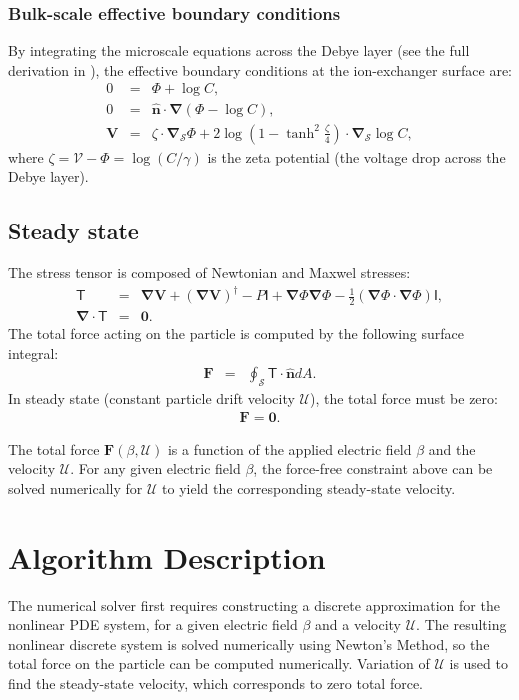 \documentclass[final]{elsarticle}
\newcommand{\pars}[1]{\left(#1\right)}
\newcommand\bnabla{\boldsymbol{\nabla}}
\newcommand\bV{\boldsymbol{V}}
\newcommand\bF{\boldsymbol{F}}
\newcommand\bnhat{\hat{\boldsymbol{n}}}
\newcommand\bzero{\boldsymbol{0}}
\newcommand\cU{\mathscr{U}}
\newcommand\cV{\mathscr{V}}
\newcommand\tI{\mathsf{I}}
\newcommand\tT{\mathsf{T}}
\begin{document}
\subsubsection{Bulk-scale effective boundary conditions}
By integrating the microscale equations across the Debye layer
(see the full derivation in \cite{yariv2010asymptotic}), 
the effective boundary conditions at the ion-exchanger surface are:
\begin{eqnarray*}
0 &=& \varPhi + \log C, \\
0 &=& \bnhat \cdot \bnabla \pars{\varPhi - \log C}, \\
\bV &=& 
\zeta \cdot \bnabla_\mathcal{S} \varPhi 
+ 2\log\pars{1-\tanh^2\frac{\zeta}{4}} \cdot \bnabla_\mathcal{S} \log C,
\end{eqnarray*}
where $\zeta = \cV - \varPhi = \log (C / \gamma)$ 
is the zeta potential (the voltage drop across the Debye layer).

\subsection{Steady state}
The stress tensor is composed of Newtonian and Maxwel stresses:
\begin{eqnarray*}
\tT &=& \bnabla \bV + (\bnabla \bV)^\dagger - P \tI
+ \bnabla \varPhi \bnabla \varPhi - \frac{1}{2} (\bnabla \varPhi \cdot \bnabla \varPhi) \tI, \\
\bnabla \cdot \tT &=& \bzero.
\end{eqnarray*}
The total force acting on the particle is computed by the following surface integral:
\begin{eqnarray*}
\bF &=& \oint_\mathcal{S} \tT \cdot \bnhat dA.
\end{eqnarray*}
In steady state (constant particle drift velocity $\cU$), 
the total force must be zero: 
\begin{eqnarray*}
\bF = \bzero.
\end{eqnarray*}

The total force $\bF(\beta, \cU)$ is a function of the applied electric field $\beta$ and
the velocity $\cU$.
For any given electric field $\beta$, the force-free constraint above 
can be solved numerically for $\cU$ to yield the corresponding steady-state velocity.

\section{Algorithm Description} \label{sec:algorithm}
The numerical solver first requires constructing a discrete 
approximation for the nonlinear PDE system,
for a given electric field $\beta$ and a velocity $\cU$. 
The resulting nonlinear discrete system is
solved numerically using Newton's Method, so the total force on the particle can be computed
numerically. Variation of $\cU$ is used to find the steady-state velocity, 
which corresponds to zero total force.
\end{document}
